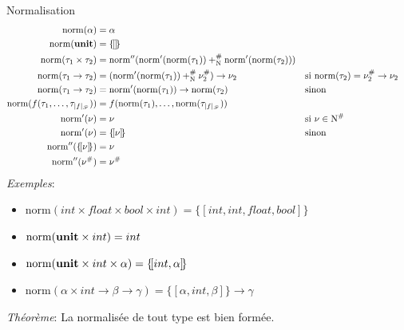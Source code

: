 \documentclass[serif]{beamer}
\newcommand{\exemples}{\textit{Exemples}\xspace}
\newcommand{\theoreme}{\textit{Théorème}\xspace}
\newcommand{\mset}[1]{\{\![#1]\!\}}
\newcommand{\unit}{\bold{unit}}
\newcommand{\norm}{\mathrm{norm}}
\newcommand{\F}{\mathscr{F}}
\newcommand{\N}{\mathrm{N}}
\begin{document}
\begin{frame}{Normalisation}
\tiny
\begin{align*}
    \norm (\alpha) &=
    \alpha
  \\
    \norm (\unit) &=
    \mset{}
  \\
    \norm (\tau_1 \times \tau_2) &=
    \norm'' (\norm' (\norm (\tau_1)) +^\#_\N \norm' (\norm (\tau_2)))
  \\
    \norm (\tau_1 \rightarrow \tau_2) &=
    (\norm' (\norm (\tau_1)) +^\#_\N \nu^\#_2) \rightarrow \nu_2 &&
    \text{si } \norm (\tau_2) = \nu^\#_2 \rightarrow \nu_2
  \\
    \norm (\tau_1 \rightarrow \tau_2) &=
    \norm' (\norm (\tau_1)) \rightarrow \norm (\tau_2) &&
    \text{sinon}
  \\
    \norm (f (\tau_1, \dots, \tau_{|f|_\F})) &=
    f (\norm (\tau_1), \dots, \norm (\tau_{|f|_\F}))
  \\
    \norm' (\nu) &=
    \nu &&
    \text{si } \nu \in \N^\#
  \\
    \norm' (\nu) &=
    \mset{\nu} &&
    \text{sinon}
  \\
    \norm'' (\mset{\nu}) &=
    \nu
  \\
    \norm'' (\nu^\#) &=
    \nu^\#
\end{align*}
\exemples :
\begin{itemize}
  \item $\norm (int \times float \times bool \times int) = \mset{int, int, float, bool}$
  \item $\norm (\unit \times int) = int$
  \item $\norm (\unit \times int \times \alpha) = \mset{int, \alpha}$
  \item $\norm (\alpha \times int \rightarrow \beta \rightarrow \gamma) = \mset{\alpha, int, \beta} \rightarrow \gamma$
\end{itemize}
\bigskip
\theoreme :
La normalisée de tout type est bien formée.
\end{frame}

\end{document}
